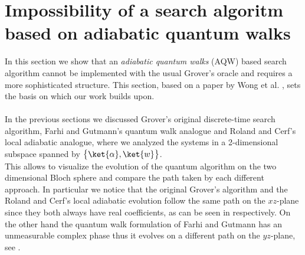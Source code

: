 \section{Impossibility of a search algoritm based on adiabatic quantum walks}\label{impossibility}
In this section we show that an \textit{adiabatic quantum walks} (AQW) based search algorithm cannot be implemented with the usual Grover's oracle and requires a more sophisticated structure. This section, based on a paper by Wong et al. \cite{Wong2016}, sets the basis on which our work builds upon. \\ \\
In the previous sections we discussed Grover's original discrete-time search algorithm, Farhi and Gutmann's quantum walk analogue and Roland and Cerf's local adiabatic analogue, where we analyzed the systems in a 2-dimensional subspace spanned by $\big\{\ket{\alpha}, \ket{w}\big\}$. \\This allows to visualize the evolution of the quantum algorithm on the two dimensional Bloch sphere and compare the path taken by each different approach. In particular we notice that the original Grover's algorithm and the Roland and Cerf's local adiabatic evolution follow the same path on the $xz$-plane since they both always have real coefficients, as can be seen in  respectively. On the other hand the quantum walk formulation of Farhi and Gutmann has an unmeasurable complex phase thus it evolves on a different path on the $yz$-plane, see .
